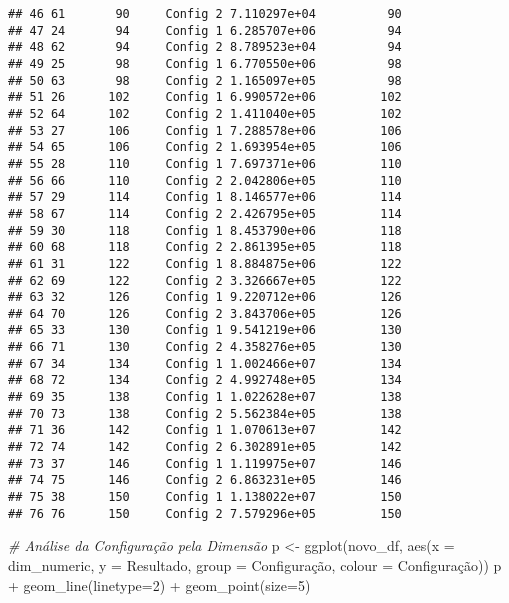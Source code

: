 \documentclass[
]{article}
\newenvironment{Shaded}{\begin{snugshade}}{\end{snugshade}}
\newcommand{\AttributeTok}[1]{\textcolor[rgb]{0.77,0.63,0.00}{#1}}
\newcommand{\CommentTok}[1]{\textcolor[rgb]{0.56,0.35,0.01}{\textit{#1}}}
\newcommand{\DecValTok}[1]{\textcolor[rgb]{0.00,0.00,0.81}{#1}}
\newcommand{\FunctionTok}[1]{\textcolor[rgb]{0.00,0.00,0.00}{#1}}
\newcommand{\NormalTok}[1]{#1}
\newcommand{\OtherTok}[1]{\textcolor[rgb]{0.56,0.35,0.01}{#1}}
\newcommand{\SpecialCharTok}[1]{\textcolor[rgb]{0.00,0.00,0.00}{#1}}
\begin{document}
\begin{verbatim}
## 46 61       90     Config 2 7.110297e+04          90
## 47 24       94     Config 1 6.285707e+06          94
## 48 62       94     Config 2 8.789523e+04          94
## 49 25       98     Config 1 6.770550e+06          98
## 50 63       98     Config 2 1.165097e+05          98
## 51 26      102     Config 1 6.990572e+06         102
## 52 64      102     Config 2 1.411040e+05         102
## 53 27      106     Config 1 7.288578e+06         106
## 54 65      106     Config 2 1.693954e+05         106
## 55 28      110     Config 1 7.697371e+06         110
## 56 66      110     Config 2 2.042806e+05         110
## 57 29      114     Config 1 8.146577e+06         114
## 58 67      114     Config 2 2.426795e+05         114
## 59 30      118     Config 1 8.453790e+06         118
## 60 68      118     Config 2 2.861395e+05         118
## 61 31      122     Config 1 8.884875e+06         122
## 62 69      122     Config 2 3.326667e+05         122
## 63 32      126     Config 1 9.220712e+06         126
## 64 70      126     Config 2 3.843706e+05         126
## 65 33      130     Config 1 9.541219e+06         130
## 66 71      130     Config 2 4.358276e+05         130
## 67 34      134     Config 1 1.002466e+07         134
## 68 72      134     Config 2 4.992748e+05         134
## 69 35      138     Config 1 1.022628e+07         138
## 70 73      138     Config 2 5.562384e+05         138
## 71 36      142     Config 1 1.070613e+07         142
## 72 74      142     Config 2 6.302891e+05         142
## 73 37      146     Config 1 1.119975e+07         146
## 74 75      146     Config 2 6.863231e+05         146
## 75 38      150     Config 1 1.138022e+07         150
## 76 76      150     Config 2 7.579296e+05         150
\end{verbatim}

\begin{Shaded}
\begin{Highlighting}[]
\CommentTok{\# Análise da Configuração pela Dimensão}
\NormalTok{p }\OtherTok{\textless{}{-}} \FunctionTok{ggplot}\NormalTok{(novo\_df, }\FunctionTok{aes}\NormalTok{(}\AttributeTok{x =}\NormalTok{ dim\_numeric, }
                         \AttributeTok{y =}\NormalTok{ Resultado, }
                         \AttributeTok{group =}\NormalTok{ Configuração, }
                         \AttributeTok{colour =}\NormalTok{ Configuração))}
\NormalTok{p }\SpecialCharTok{+} \FunctionTok{geom\_line}\NormalTok{(}\AttributeTok{linetype=}\DecValTok{2}\NormalTok{) }\SpecialCharTok{+} \FunctionTok{geom\_point}\NormalTok{(}\AttributeTok{size=}\DecValTok{5}\NormalTok{)}
\end{Highlighting}
\end{Shaded}
\end{document}
